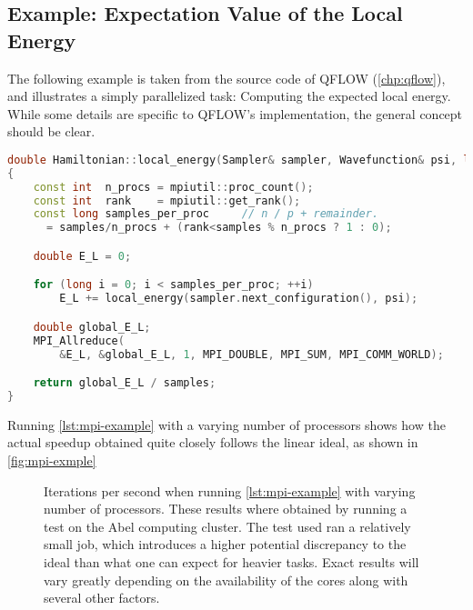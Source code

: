 \documentclass[Thesis.tex]{subfiles}
\begin{document}
\subsection{Example: Expectation Value of the Local Energy}

The following example is taken from the source code of QFLOW (\cref{chp:qflow}),
and illustrates a simply parallelized task: Computing the expected local energy.
While some details are specific to QFLOW's implementation, the general concept
should be clear.

\begin{center}
\begin{lstlisting}[language=C++, caption={Example excerpt
from the source code of QFLOW~\cite{qflow}, showing an MPI parallelized
computation of the expected local energy.}, label={lst:mpi-example}]
double Hamiltonian::local_energy(Sampler& sampler, Wavefunction& psi, long samples) const
{
    const int  n_procs = mpiutil::proc_count();
    const int  rank    = mpiutil::get_rank();
    const long samples_per_proc     // n / p + remainder.
      = samples/n_procs + (rank<samples % n_procs ? 1 : 0);

    double E_L = 0;

    for (long i = 0; i < samples_per_proc; ++i)
        E_L += local_energy(sampler.next_configuration(), psi);

    double global_E_L;
    MPI_Allreduce(
        &E_L, &global_E_L, 1, MPI_DOUBLE, MPI_SUM, MPI_COMM_WORLD);

    return global_E_L / samples;
}
\end{lstlisting}
\end{center}
Running \cref{lst:mpi-example} with a varying number of processors shows how the
actual speedup obtained quite closely follows the linear ideal, as shown in \cref{fig:mpi-exmple}


\begin{figure}[h]
  \centering
    \resizebox{0.7\linewidth}{!}{%
        
    }
  \caption{Iterations per second when running \cref{lst:mpi-example} with
    varying number of processors. These results where obtained by running a test
    on the Abel computing cluster. The test used ran a relatively small job,
    which introduces a higher potential discrepancy to the ideal than what one
    can expect for heavier tasks. Exact results will vary greatly depending on
    the availability of the cores along with several other factors.}
  \label{fig:mpi-example}
\end{figure}
\end{document}

